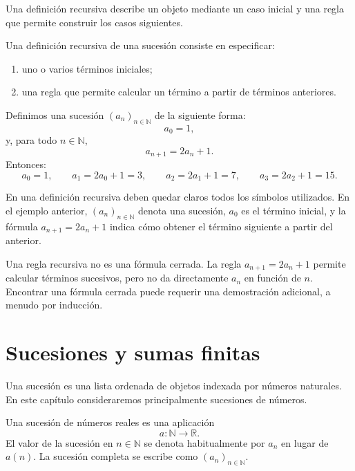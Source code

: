 Una definición recursiva describe un objeto mediante un caso inicial y una regla que permite construir los casos siguientes.

\begin{definicion}
Una definición recursiva de una sucesión consiste en especificar:
\begin{enumerate}
  \item uno o varios términos iniciales;
  \item una regla que permite calcular un término a partir de términos anteriores.
\end{enumerate}
\end{definicion}

\begin{ejemplo}
Definimos una sucesión \((a_n)_{n\in\mathbb{N}}\) de la siguiente forma:
\[
  a_0=1,
\]
y, para todo \(n\in\mathbb{N}\),
\[
  a_{n+1}=2a_n+1.
\]
Entonces:
\[
  a_0=1,
  \qquad
  a_1=2a_0+1=3,
  \qquad
  a_2=2a_1+1=7,
  \qquad
  a_3=2a_2+1=15.
\]
\end{ejemplo}

En una definición recursiva deben quedar claros todos los símbolos utilizados. En el ejemplo anterior, \((a_n)_{n\in\mathbb{N}}\) denota una sucesión, \(a_0\) es el término inicial, y la fórmula \(a_{n+1}=2a_n+1\) indica cómo obtener el término siguiente a partir del anterior.

\begin{advertencia}
Una regla recursiva no es una fórmula cerrada. La regla \(a_{n+1}=2a_n+1\) permite calcular términos sucesivos, pero no da directamente \(a_n\) en función de \(n\). Encontrar una fórmula cerrada puede requerir una demostración adicional, a menudo por inducción.
\end{advertencia}

\section{Sucesiones y sumas finitas}

Una sucesión es una lista ordenada de objetos indexada por números naturales. En este capítulo consideraremos principalmente sucesiones de números.

\begin{definicion}[Sucesión]
Una sucesión de números reales es una aplicación
\[
  a:\mathbb{N}\longrightarrow\mathbb{R}.
\]
El valor de la sucesión en \(n\in\mathbb{N}\) se denota habitualmente por \(a_n\) en lugar de \(a(n)\). La sucesión completa se escribe como \((a_n)_{n\in\mathbb{N}}\).
\end{definicion}

